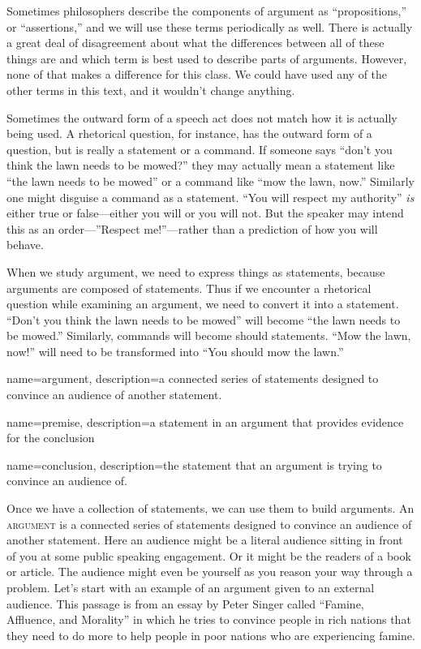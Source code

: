 Sometimes philosophers describe the components of argument as ``propositions,'' or ``assertions,'' and we will use these terms periodically as well.  There is actually a great deal of disagreement about what the differences between all of these things are and which term is best used to describe parts of arguments. However, none of that makes a difference for this class. We could have used any of the other terms in this text, and it wouldn't change anything. 

Sometimes the outward form of a speech act does not match how it is actually being used. A rhetorical question, for instance, has the outward form of a question, but is really a statement or a command. If someone says ``don't you think the lawn needs to be mowed?'' they may actually mean a statement like ``the lawn needs to be mowed'' or a command like ``mow the lawn, now.'' Similarly one might disguise a command as a statement. ``You will respect my authority'' \emph{is} either true or false---either you will or you will not. But the speaker may intend this as an order---''Respect me!''---rather than a prediction of how you will behave.

When we study argument, we need to express things as statements, because arguments are composed of statements. Thus if we encounter a rhetorical question while examining an argument, we need to convert it into a statement. ``Don't you think the lawn needs to be mowed'' will become ``the lawn needs to be mowed.'' Similarly, commands will become should statements. ``Mow the lawn, now!'' will need to be transformed into ``You should mow the lawn.'' 

{
name=argument,
description={a connected series of statements designed to convince an audience of another statement.}
}

{
name=premise,
description={a statement in an argument that provides evidence for the conclusion}
}

{
name=conclusion,
description={the statement that an argument is trying to convince an audience of.}
}

 
Once we have a collection of statements, we can use them to build arguments. An \textsc{\gls{argument}} \label{def:Argument} is a connected series of statements designed to convince an audience of another statement. Here an audience might be a literal audience sitting in front of you at some public speaking engagement. Or it might be the readers of a book or article. The audience might even be yourself as you reason your way through a problem. Let's start with an example of an argument given to an external audience. This passage is from an essay by Peter Singer called ``Famine, Affluence, and Morality'' in which he tries to convince people in rich nations that they need to do more to help people in poor nations who are experiencing famine.


